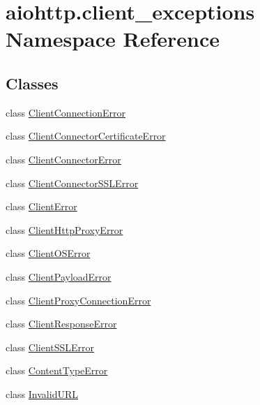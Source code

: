 \hypertarget{namespaceaiohttp_1_1client__exceptions}{}\section{aiohttp.\+client\+\_\+exceptions Namespace Reference}
\label{namespaceaiohttp_1_1client__exceptions}
\subsection*{Classes}
\begin{DoxyCompactItemize}
\item 
class \hyperlink{classaiohttp_1_1client__exceptions_1_1_client_connection_error}{Client\+Connection\+Error}
\item 
class \hyperlink{classaiohttp_1_1client__exceptions_1_1_client_connector_certificate_error}{Client\+Connector\+Certificate\+Error}
\item 
class \hyperlink{classaiohttp_1_1client__exceptions_1_1_client_connector_error}{Client\+Connector\+Error}
\item 
class \hyperlink{classaiohttp_1_1client__exceptions_1_1_client_connector_s_s_l_error}{Client\+Connector\+S\+S\+L\+Error}
\item 
class \hyperlink{classaiohttp_1_1client__exceptions_1_1_client_error}{Client\+Error}
\item 
class \hyperlink{classaiohttp_1_1client__exceptions_1_1_client_http_proxy_error}{Client\+Http\+Proxy\+Error}
\item 
class \hyperlink{classaiohttp_1_1client__exceptions_1_1_client_o_s_error}{Client\+O\+S\+Error}
\item 
class \hyperlink{classaiohttp_1_1client__exceptions_1_1_client_payload_error}{Client\+Payload\+Error}
\item 
class \hyperlink{classaiohttp_1_1client__exceptions_1_1_client_proxy_connection_error}{Client\+Proxy\+Connection\+Error}
\item 
class \hyperlink{classaiohttp_1_1client__exceptions_1_1_client_response_error}{Client\+Response\+Error}
\item 
class \hyperlink{classaiohttp_1_1client__exceptions_1_1_client_s_s_l_error}{Client\+S\+S\+L\+Error}
\item 
class \hyperlink{classaiohttp_1_1client__exceptions_1_1_content_type_error}{Content\+Type\+Error}
\item 
class \hyperlink{classaiohttp_1_1client__exceptions_1_1_invalid_u_r_l}{Invalid\+U\+RL}

\end{DoxyCompactItemize}
